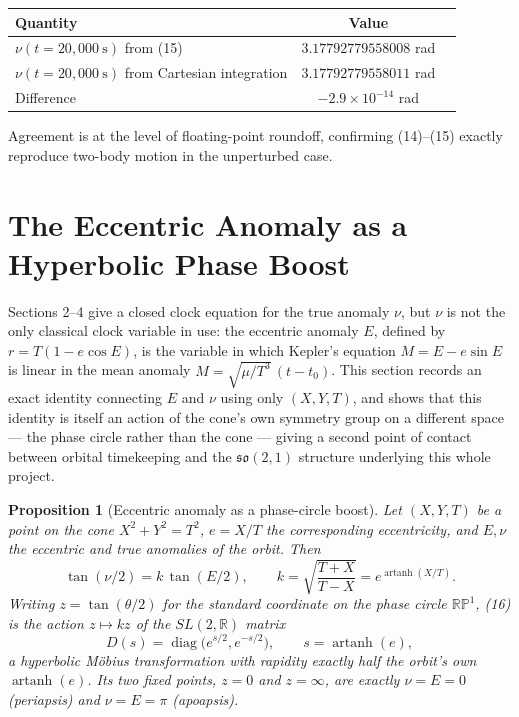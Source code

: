 \documentclass[12pt]{amsart}
\theoremstyle{plain}
\newtheorem{proposition}[theorem]{Proposition}
\theoremstyle{remark}
\begin{document}
\begin{center}
\begin{tabular}{lcc}
\hline
Quantity & Value \\
\hline
$\nu(t{=}20{,}000\ \mathrm{s})$ from (15) & $3.17792779558008$ rad \\
$\nu(t{=}20{,}000\ \mathrm{s})$ from Cartesian integration & $3.17792779558011$ rad \\
Difference & $-2.9\times10^{-14}$ rad \\
\hline
\end{tabular}
\end{center}

Agreement is at the level of floating-point roundoff, confirming (14)--(15) exactly reproduce two-body motion in the unperturbed case.

\section{The Eccentric Anomaly as a Hyperbolic Phase Boost}

Sections 2--4 give a closed clock equation for the true anomaly $\nu$, but $\nu$ is not the only classical clock variable in use: the eccentric anomaly $E$, defined by $r=T(1-e\cos E)$, is the variable in which Kepler's equation $M=E-e\sin E$ is linear in the mean anomaly $M=\sqrt{\mu/T^3}\,(t-t_0)$. This section records an exact identity connecting $E$ and $\nu$ using only $(X,Y,T)$, and shows that this identity is itself an action of the cone's own symmetry group \cite{Ebert2026EigenCoord} on a different space --- the phase circle rather than the cone --- giving a second point of contact between orbital timekeeping and the $\mathfrak{so}(2,1)$ structure underlying this whole project.

\begin{proposition}[Eccentric anomaly as a phase-circle boost]\label{prop:Eboost}
Let $(X,Y,T)$ be a point on the cone $X^2+Y^2=T^2$, $e=X/T$ the corresponding eccentricity, and $E,\nu$ the eccentric and true anomalies of the orbit. Then
\begin{equation}
\tan(\nu/2) = k\,\tan(E/2), \qquad k=\sqrt{\frac{T+X}{T-X}}=e^{\operatorname{artanh}(X/T)}. \tag{16}
\end{equation}
Writing $z=\tan(\theta/2)$ for the standard coordinate on the phase circle $\mathbb{RP}^1$, (16) is the action $z\mapsto kz$ of the $SL(2,\mathbb R)$ matrix
\begin{equation}
D(s)=\operatorname{diag}\!\big(e^{s/2},e^{-s/2}\big), \qquad s=\operatorname{artanh}(e), \tag{17}
\end{equation}
a hyperbolic Möbius transformation with rapidity exactly half the orbit's own $\operatorname{artanh}(e)$. Its two fixed points, $z=0$ and $z=\infty$, are exactly $\nu=E=0$ (periapsis) and $\nu=E=\pi$ (apoapsis).
\end{proposition}
\end{document}
